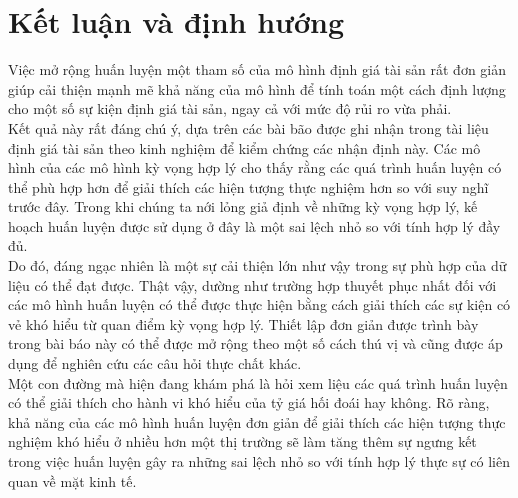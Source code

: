 \documentclass[10pt,a4paper]{article}
\begin{document}
\section{Kết luận và định hướng}
Việc mở rộng huấn luyện một tham số của mô hình định giá tài sản rất đơn giản giúp cải thiện mạnh mẽ khả năng của mô hình để tính toán một cách định lượng cho một số sự kiện định giá tài sản, ngay cả với mức độ rủi ro vừa phải. 
\\Kết quả này rất đáng chú ý, dựa trên các bài bão được ghi nhận trong tài liệu định giá tài sản theo kinh nghiệm để kiểm chứng các nhận định này. Các mô hình của các mô hình kỳ vọng hợp lý cho thấy rằng các quá trình huấn luyện có thể phù hợp hơn để giải thích các hiện tượng thực nghiệm hơn so với suy nghĩ trước đây. Trong khi chúng ta nới lỏng giả định về những kỳ vọng hợp lý, kế hoạch huấn luyện được sử dụng ở đây là một sai lệch nhỏ so với tính hợp lý đầy đủ. \\
Do đó, đáng ngạc nhiên là một sự cải thiện lớn như vậy trong sự phù hợp của dữ liệu có thể đạt được. Thật vậy, dường như trường hợp thuyết phục nhất đối với các mô hình huấn luyện có thể được thực hiện bằng cách giải thích các sự kiện có vẻ khó hiểu từ quan điểm kỳ vọng hợp lý. Thiết lập đơn giản được trình bày trong bài báo này có thể được mở rộng theo một số cách thú vị và cũng được áp dụng để nghiên cứu các câu hỏi thực chất khác. \\
Một con đường mà hiện đang khám phá là hỏi xem liệu các quá trình huấn luyện có thể giải thích cho hành vi khó hiểu của tỷ giá hối đoái hay không. Rõ ràng, khả năng của các mô hình huấn luyện đơn giản để giải thích các hiện tượng thực nghiệm khó hiểu ở nhiều hơn một thị trường sẽ làm tăng thêm sự ngưng kết trong việc huấn luyện gây ra những sai lệch nhỏ so với tính hợp lý thực sự có liên quan về mặt kinh tế.
\end{document}
